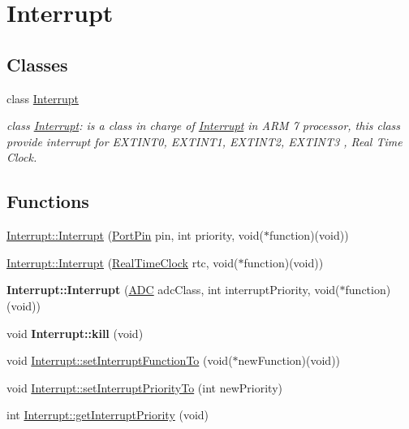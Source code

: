 \hypertarget{group__group10}{
\section{Interrupt}
\label{group__group10}
}
\subsection*{Classes}
\begin{DoxyCompactItemize}
\item 
class \hyperlink{class_interrupt}{Interrupt}
\begin{DoxyCompactList}\small\item\em class \hyperlink{class_interrupt}{Interrupt}: is a class in charge of \hyperlink{class_interrupt}{Interrupt} in ARM 7 processor, this class provide interrupt for EXTINT0, EXTINT1, EXTINT2, EXTINT3 , Real Time Clock. \end{DoxyCompactList}\end{DoxyCompactItemize}
\subsection*{Functions}
\begin{DoxyCompactItemize}
\item 
\hyperlink{group__group10_ga4fd8be38d92c8b0086b15b3c30ea1868}{Interrupt::Interrupt} (\hyperlink{class_port_pin}{PortPin} pin, int priority, void($\ast$function)(void))
\item 
\hyperlink{group__group10_gaa75f0f80c17bbc01b8fba32ab942dfbd}{Interrupt::Interrupt} (\hyperlink{class_real_time_clock}{RealTimeClock} rtc, void($\ast$function)(void))
\item 
\hypertarget{group__group10_ga97db0b3a65b1bf59a97d8a0b7867c69c}{
{\bfseries Interrupt::Interrupt} (\hyperlink{class_a_d_c}{ADC} adcClass, int interruptPriority, void($\ast$function)(void))}
\label{group__group10_ga97db0b3a65b1bf59a97d8a0b7867c69c}

\item 
\hypertarget{group__group10_ga60f69c94b5cf138e70712d17e9d5ebe4}{
void {\bfseries Interrupt::kill} (void)}
\label{group__group10_ga60f69c94b5cf138e70712d17e9d5ebe4}

\item 
void \hyperlink{group__group10_gac34af4078409af8f5b612477caa107df}{Interrupt::setInterruptFunctionTo} (void($\ast$newFunction)(void))
\item 
void \hyperlink{group__group10_ga4cd6bc79c3fa54378a156117de5f12a9}{Interrupt::setInterruptPriorityTo} (int newPriority)
\item 
int \hyperlink{group__group10_ga8d3124b3721e2426dc24fc8416f12e38}{Interrupt::getInterruptPriority} (void)
\end{DoxyCompactItemize}


